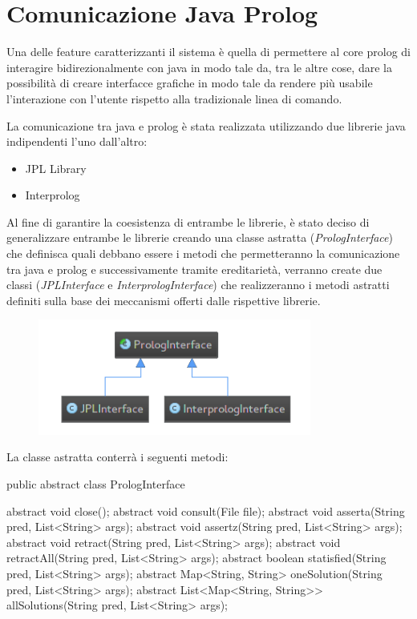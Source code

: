 
\section{Comunicazione Java Prolog}
\label{java-prolog}
Una delle feature caratterizzanti il sistema è quella di permettere al core prolog di interagire bidirezionalmente con java in modo tale da, tra le altre cose, dare la possibilità di creare interfacce grafiche in modo tale da rendere più usabile l'interazione con l'utente rispetto alla tradizionale linea di comando.

La comunicazione tra java e prolog è stata realizzata utilizzando due librerie java indipendenti l'uno dall'altro:
\begin{itemize}
	\item JPL Library
	\item Interprolog
\end{itemize}
Al fine di garantire la coesistenza di entrambe le librerie, è stato deciso di generalizzare entrambe le librerie creando una classe astratta (\emph{PrologInterface}) che definisca quali debbano essere i metodi che permetteranno la comunicazione tra java e prolog e successivamente tramite ereditarietà, verranno create due classi (\emph{JPLInterface} e \emph{InterprologInterface}) che realizzeranno i metodi astratti definiti sulla base dei meccanismi offerti dalle rispettive librerie.

\begin{figure}[H]
	\centering
	\includegraphics[width=0.8\textwidth]{img/prologInterface.png}
\end{figure}

La classe astratta conterrà i seguenti metodi:

\begin{javacode}
public abstract class PrologInterface {

  abstract void close();
  abstract void consult(File file);
  abstract void asserta(String pred, List<String> args);
  abstract void assertz(String pred, List<String> args);
  abstract void retract(String pred, List<String> args);
  abstract void retractAll(String pred, List<String> args);
  abstract boolean statisfied(String pred, List<String> args);
  abstract Map<String, String> oneSolution(String pred, List<String> args);
  abstract List<Map<String, String>> allSolutions(String pred, List<String> args);
}
\end{javacode}

